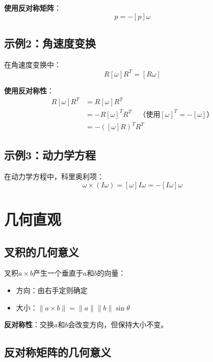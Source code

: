 \documentclass[12pt,a4paper]{article}
\begin{document}
\textbf{使用反对称矩阵}：
\begin{equation}
[\omega] p = -[p] \omega
\end{equation}

\subsection{示例2：角速度变换}

在角速度变换中：
\begin{equation}
R [\omega] R^T = [R \omega]
\end{equation}

\textbf{使用反对称性}：
\begin{align}
R [\omega] R^T &= R [\omega] R^T \\
&= -R [\omega]^T R^T \quad \text{（使用$[\omega]^T = -[\omega]$）} \\
&= -([\omega] R)^T R^T
\end{align}

\subsection{示例3：动力学方程}

在动力学方程中，科里奥利项：
\begin{equation}
\omega \times (I \omega) = [\omega] I \omega = -[I \omega] \omega
\end{equation}

\section{几何直观}

\subsection{叉积的几何意义}

叉积$a \times b$产生一个垂直于$a$和$b$的向量：
\begin{itemize}
\item 方向：由右手定则确定
\item 大小：$\|a \times b\| = \|a\| \|b\| \sin\theta$
\end{itemize}

\textbf{反对称性}：交换$a$和$b$会改变方向，但保持大小不变。

\subsection{反对称矩阵的几何意义}
\end{document}
